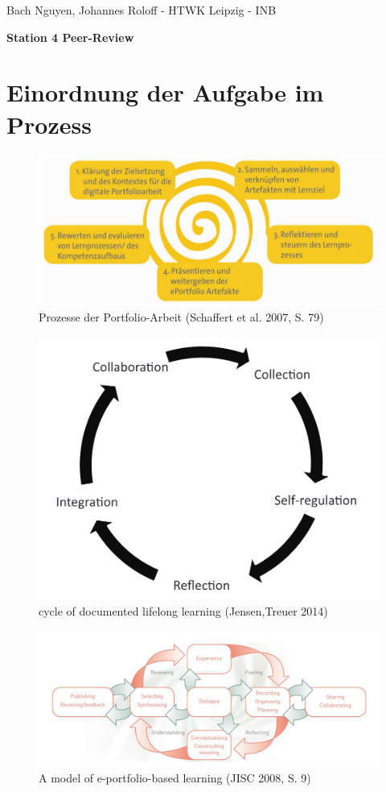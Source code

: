 \documentclass[a4paper,oneside]{scrarticle}
\begin{document}
	\begin{flushleft}
		Bach Nguyen, Johannes Roloff - HTWK Leipzig - INB
	\end{flushleft}
	\begin{center}
		\begin{LARGE}
			\textbf{Station 4 Peer-Review}
		\end{LARGE}
	\end{center}
	\section*{Einordnung der Aufgabe im Prozess}
	\begin{figure} [h]
		\centering
		\includegraphics[width=0.7\linewidth]{e-portfolio-prozesse-schaffert}
		\caption{Prozesse der Portfolio-Arbeit (Schaffert et al. 2007, S. 79)}
		\label{fig:e-portfolio-prozesse-schaffert}
	\end{figure}
	\begin{figure}[h]
		\centering
		\includegraphics[width=0.5\linewidth]{cycle-of-documented-lifelong-learning-Jensen}
		\caption{cycle of documented lifelong learning (Jensen,Treuer 2014)}
		\label{fig:cycle-of-documented-lifelong-learning-jensen}
	\end{figure}
	\begin{figure}[h]
		\centering
		\includegraphics[width=0.8\linewidth]{model-of-e-portfolio-based-learning}
		\caption{A model of e-portfolio-based learning (JISC 2008, S. 9)}
		\label{fig:model-of-e-portfolio-based-learning}
	\end{figure}
	\pagebreak 
	
\end{document}
